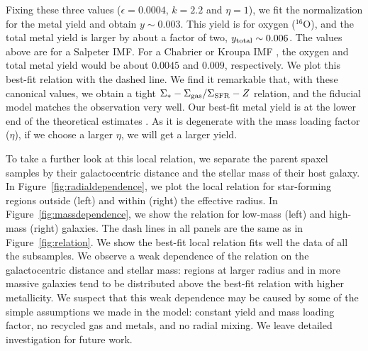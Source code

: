 \documentclass[12pt, appendixfloats, numberedappendix]{emulateapj}
\begin{document}
Fixing these three values ($\epsilon=0.0004$, $k=2.2$ and $\eta=1$), we fit the normalization for the metal yield and 
obtain $y \sim 0.003$. This yield is for oxygen ($^{16}\mathrm{O}$), 
and the total metal yield is larger by about a factor of two, $y_{\rm total} \sim 0.006$.
The values above are for a Salpeter IMF. For a Chabrier or Kroupa IMF \citep[][]{chabrier03a, kroupa01a}, 
the oxygen and total metal yield would be about $0.0045$ and $0.009$, respectively.
We plot this best-fit relation with the dashed line. 
We find it remarkable that, with these canonical values, we obtain a tight $\Sigma_{*}-\Sigma_{\rm gas}/\Sigma_{\rm SFR}-Z$ relation, 
and the fiducial model matches the observation very well.
Our best-fit metal yield is at the lower end of the theoretical estimates \citep[\eg][]{henry00a, kobayashi06a, zahid12a, vincenzo16a}.
As it is degenerate with the mass loading factor ($\eta$), if we choose a larger $\eta$, we will get a larger yield.

To take a further look at this local relation, we separate the parent spaxel samples by their galactocentric distance and the stellar mass of their host galaxy.
In Figure~\ref{fig:radialdependence}, we plot the local relation for star-forming regions outside (left) and within (right) the effective radius. 
In Figure~\ref{fig:massdependence}, we show the relation for low-mass (left) and high-mass (right) galaxies.
The dash lines in all panels are the same as in Figure~\ref{fig:relation}.
We show the best-fit local relation fits well the data of all the subsamples. 
We observe a weak dependence of the relation on the galactocentric distance and stellar mass: 
regions at larger radius and in more massive galaxies tend to be distributed above the best-fit relation with higher metallicity. 
We suspect that this weak dependence may be caused by some of the simple assumptions we made in the model: constant yield and mass loading factor, no recycled gas and metals, 
and no radial mixing. We leave detailed investigation for future work.

\end{document}
